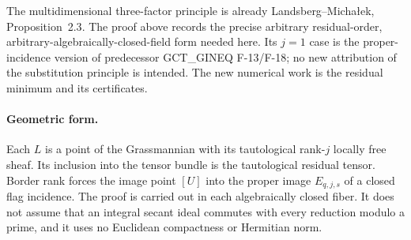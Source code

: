 The multidimensional three-factor principle is already
Landsberg--Micha{\l}ek, Proposition~2.3\cite{LM2018}.
The proof above records the precise arbitrary residual-order,
arbitrary-algebraically-closed-field form needed here. Its
$j=1$ case is the proper-incidence version of predecessor
GCT\_GINEQ F-13/F-18; no new attribution of the substitution
principle is intended. The new numerical work is the residual
minimum and its certificates.

\paragraph{Geometric form.}
Each $L$ is a point of the Grassmannian with its tautological
rank-$j$ locally free sheaf. Its inclusion into the tensor
bundle is the tautological residual tensor. Border rank forces
the image point $[U]$ into the proper image $E_{q,j,s}$ of a
closed flag incidence. The proof is carried out in each
algebraically closed fiber. It does not assume that an
integral secant ideal commutes with every reduction modulo a
prime, and it uses no Euclidean compactness or Hermitian norm.
